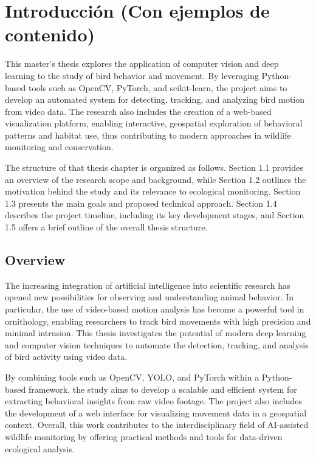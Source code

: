 
\chapter{Introducción (Con ejemplos de contenido)}

This master’s thesis explores the application of computer vision and deep learning to the study of bird behavior and movement. By leveraging Python-based tools such as OpenCV, PyTorch, and scikit-learn, the project aims to develop an automated system for detecting, tracking, and analyzing bird motion from video data. The research also includes the creation of a web-based visualization platform, enabling interactive, geospatial exploration of behavioral patterns and habitat use, thus contributing to modern approaches in wildlife monitoring and conservation.
\\
\par The structure of that thesis chapter is organized as follows. Section 1.1 provides an overview of the research scope and background, while Section 1.2 outlines the motivation behind the study and its relevance to ecological monitoring. Section 1.3 presents the main goals and proposed technical approach. Section 1.4 describes the project timeline, including its key development stages, and Section 1.5 offers a brief outline of the overall thesis structure.

\section{Overview}

The increasing integration of artificial intelligence into scientific research has opened new possibilities for observing and understanding animal behavior. In particular, the use of video-based motion analysis has become a powerful tool in ornithology, enabling researchers to track bird movements with high precision and minimal intrusion. This thesis investigates the potential of modern deep learning and computer vision techniques to automate the detection, tracking, and analysis of bird activity using video data.

By combining tools such as OpenCV, YOLO, and PyTorch within a Python-based framework, the study aims to develop a scalable and efficient system for extracting behavioral insights from raw video footage. The project also includes the development of a web interface for visualizing movement data in a geospatial context. Overall, this work contributes to the interdisciplinary field of AI-assisted wildlife monitoring by offering practical methods and tools for data-driven ecological analysis. 

